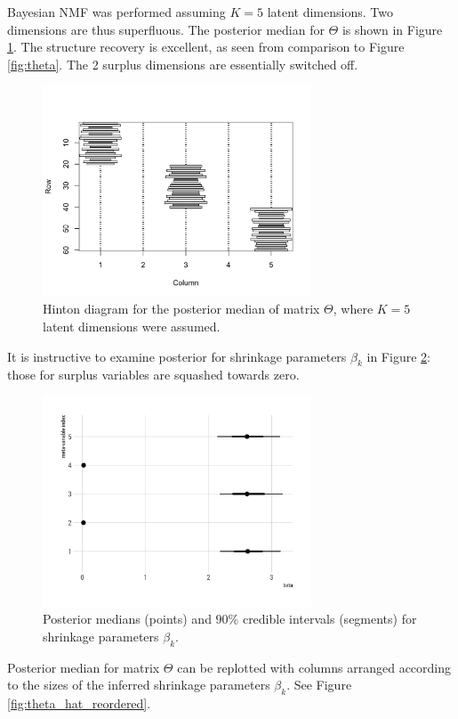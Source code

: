\documentclass[]{article}
\begin{document}
Bayesian NMF was performed assuming $K=5$ latent dimensions. Two dimensions are thus superfluous. The posterior median for $\Theta$ is shown in Figure \ref{fig:theta_hat}. The structure recovery is excellent, as seen from comparison to Figure \ref{fig:theta}. The 2 surplus dimensions are essentially switched off.

\begin{figure}
	\centering
	\includegraphics[width=8cm]{theta_hat.png}
	\caption{Hinton diagram for the posterior median of matrix $\Theta$, where $K=5$ latent dimensions were assumed.}
	\label{fig:theta_hat}
\end{figure}

It is instructive to examine posterior for shrinkage parameters $\beta_k$ in Figure \ref{fig:beta}: those for surplus variables are squashed towards zero.

\begin{figure}
	\centering
	\includegraphics[width=8cm]{beta.png}
	\caption{Posterior medians (points) and $90\%$ credible intervals (segments) for shrinkage parameters $\beta_k$.}
	\label{fig:beta}
\end{figure}

Posterior median for matrix $\Theta$ can be replotted with columns arranged according to the sizes of the inferred shrinkage parameters $\beta_k$. See Figure \ref{fig:theta_hat_reordered}.
\end{document}
